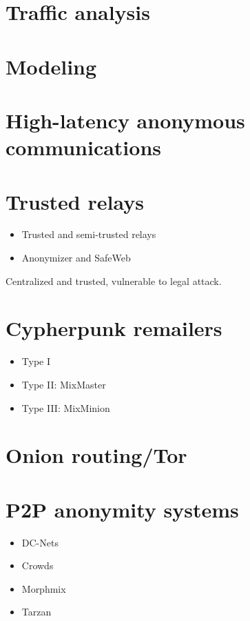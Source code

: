 \documentclass[a4paper,12pt,dutch]{article}
\begin{document}
\section{Traffic analysis}

\section{Modeling}

\section{High-latency anonymous communications}

\section{Trusted relays}
\begin{itemize}
	\item Trusted and semi-trusted relays
	\item Anonymizer and SafeWeb
\end{itemize}
Centralized and trusted, vulnerable to legal attack.

\section{Cypherpunk remailers}
\begin{itemize}
	\item Type I
	\item Type II: MixMaster
	\item Type III: MixMinion
\end{itemize}

\section{Onion routing/Tor}

\section{P2P anonymity systems}
\begin{itemize}
	\item DC-Nets
	\item Crowds
	\item Morphmix
	\item Tarzan
\end{itemize}
\end{document}
